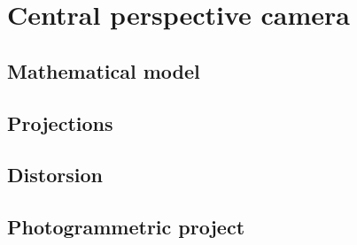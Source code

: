 \chapter{Central perspective camera}



\section{Mathematical model}



\section{Projections}


\section{Distorsion}



\section{Photogrammetric project}
